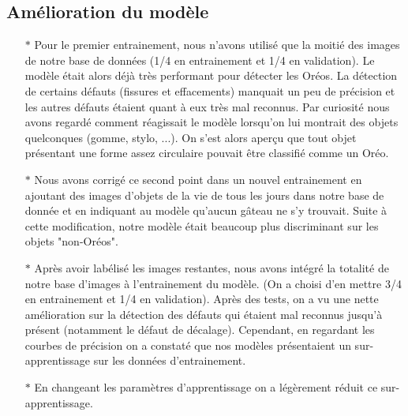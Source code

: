\documentclass{article}
\begin{document}
\subsection{Amélioration du modèle}
\begin{itemize}
    \item[$\ast$]Pour le premier entrainement, nous n'avons utilisé que la moitié des images de notre base de données (1/4 en entrainement et 1/4 en validation). Le modèle était alors déjà très performant pour détecter les Oréos. La détection de certains défauts (fissures et effacements) manquait un peu de précision et les autres défauts étaient quant à eux très mal reconnus. Par curiosité nous avons regardé comment réagissait le modèle lorsqu'on lui montrait des objets quelconques (gomme, stylo, ...). On s'est alors aperçu que tout objet présentant une forme assez circulaire pouvait être classifié comme un Oréo.
    \item[$\ast$]Nous avons corrigé ce second point dans un nouvel entrainement en ajoutant des images d'objets de la vie de tous les jours dans notre base de donnée et en indiquant au modèle qu'aucun gâteau ne s'y trouvait. Suite à cette modification, notre modèle était beaucoup plus discriminant sur les objets "non-Oréos".
    \item[$\ast$]Après avoir labélisé les images restantes, nous avons intégré la totalité de notre base d'images à l'entrainement du modèle. (On a choisi d'en mettre 3/4 en entrainement et 1/4 en validation). 
Après des tests, on a vu une nette amélioration sur la détection des défauts qui étaient mal reconnus jusqu'à présent (notamment le défaut de décalage).
Cependant, en regardant les courbes de précision on a constaté que nos modèles présentaient un sur-apprentissage sur les données d'entrainement.
    \item[$\ast$]En changeant les paramètres d'apprentissage on a légèrement réduit ce sur-apprentissage.
\\




	 
\end{itemize}
\end{document}
